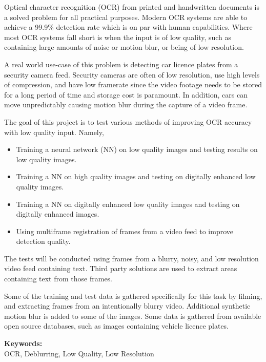 \documentclass[12pt]{article}
\begin{document}
Optical character recognition (OCR) from printed and handwritten documents is a solved problem for all practical purposes. Modern OCR systems are able to achieve a 99.9\% detection rate which is on par with human capabilities. Where most OCR systems fall short is when the input is of low quality, such as containing large amounts of noise or motion blur, or being of low resolution.

A real world use-case of this problem is detecting car licence plates from a security camera feed. Security cameras are often of low resolution, use high levels of compression, and have low framerate since the video footage needs to be stored for a long period of time and storage cost is paramount. In addition, cars can move unpredictably causing motion blur during the capture of a video frame.

The goal of this project is to test various methods of improving OCR accuracy with low quality input. Namely,
\begin{itemize}
  \item Training a neural network (NN) on low quality images and testing results on low quality images.
  \item Training a NN on high quality images and testing on digitally enhanced low quality images.
  \item Training a NN on digitally enhanced low quality images and testing on digitally enhanced images.
  \item Using multiframe registration of frames from a video feed to improve detection quality.
\end{itemize}

The tests will be conducted using frames from a blurry, noisy, and low resolution video feed containing text. Third party solutions are used to extract areas containing text from those frames.

Some of the training and test data is gathered specifically for this task by filming, and extracting frames from an intentionally blurry video. Additional synthetic motion blur is added to some of the images. Some data is gathered from available open source databases, such as images containing vehicle licence plates.

\vspace*{1ex}

\noindent\textbf{Keywords:}\\

OCR, Deblurring, Low Quality, Low Resolution

\end{document}
